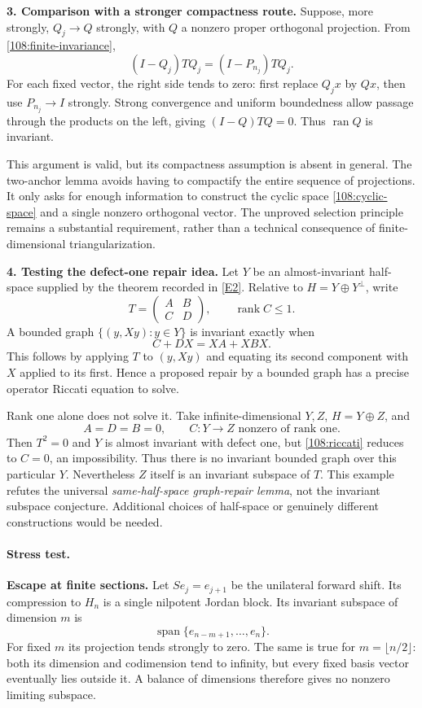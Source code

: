 \documentclass[11pt,a4paper]{article}
\newcommand{\eref}[2]{\hyperlink{extra:#1:#2}{[E#2]}}
\numberwithin{equation}{section}
\begin{document}
\medskip
\textbf{3. Comparison with a stronger compactness route.}
Suppose, more strongly, $Q_j\to Q$ strongly, with $Q$ a nonzero proper
orthogonal projection. From \eqref{108:finite-invariance},
\[
 (I-Q_j)TQ_j=(I-P_{n_j})TQ_j.
\]
For each fixed vector, the right side tends to zero: first replace $Q_jx$
by $Qx$, then use $P_{n_j}\to I$ strongly. Strong convergence and uniform
boundedness allow passage through the products on the left, giving
$(I-Q)TQ=0$. Thus $\operatorname{ran}Q$ is invariant.

This argument is valid, but its compactness assumption is absent in general.
The two-anchor lemma avoids having to compactify the entire sequence of
projections. It only asks for enough information to construct the cyclic
space \eqref{108:cyclic-space} and a single nonzero orthogonal vector.
The unproved selection principle remains a substantial requirement, rather
than a technical consequence of finite-dimensional triangularization.

\medskip
\textbf{4. Testing the defect-one repair idea.}
Let $Y$ be an almost-invariant half-space supplied by the theorem recorded
in \eref{108}{2}. Relative to $H=Y\oplus Y^\perp$, write
\[
 T=\begin{pmatrix}A&B\\ C&D\end{pmatrix},\qquad\operatorname{rank}C\leq1.
\]
A bounded graph $\{(y,Xy):y\in Y\}$ is invariant exactly when
\begin{equation}\label{108:riccati}
 C+DX=XA+XBX.
\end{equation}
This follows by applying $T$ to $(y,Xy)$ and equating its second component
with $X$ applied to its first. Hence a proposed repair by a bounded graph
has a precise operator Riccati equation to solve.

Rank one alone does not solve it. Take infinite-dimensional $Y,Z$,
$H=Y\oplus Z$, and
\[
 A=D=B=0,\qquad C:Y\to Z\text{ nonzero of rank one}.
\]
Then $T^2=0$ and $Y$ is almost invariant with defect one, but
\eqref{108:riccati} reduces to $C=0$, an impossibility. Thus there is no
invariant bounded graph over this particular $Y$. Nevertheless $Z$ itself
is an invariant subspace of $T$. This example refutes the universal
\emph{same-half-space graph-repair lemma}, not the invariant subspace
conjecture. Additional choices of half-space or genuinely different
constructions would be needed.

\paragraph{Stress test.}
\textbf{Escape at finite sections.}
Let $S e_j=e_{j+1}$ be the unilateral forward shift. Its compression to $H_n$
is a single nilpotent Jordan block. Its invariant subspace of dimension $m$
is
\[
 \operatorname{span}\{e_{n-m+1},\ldots,e_n\}.
\]
For fixed $m$ its projection tends strongly to zero. The same is true for
$m=\lfloor n/2\rfloor$: both its dimension and codimension tend to infinity,
but every fixed basis vector eventually lies outside it. A balance of
dimensions therefore gives no nonzero limiting subspace.
\end{document}
